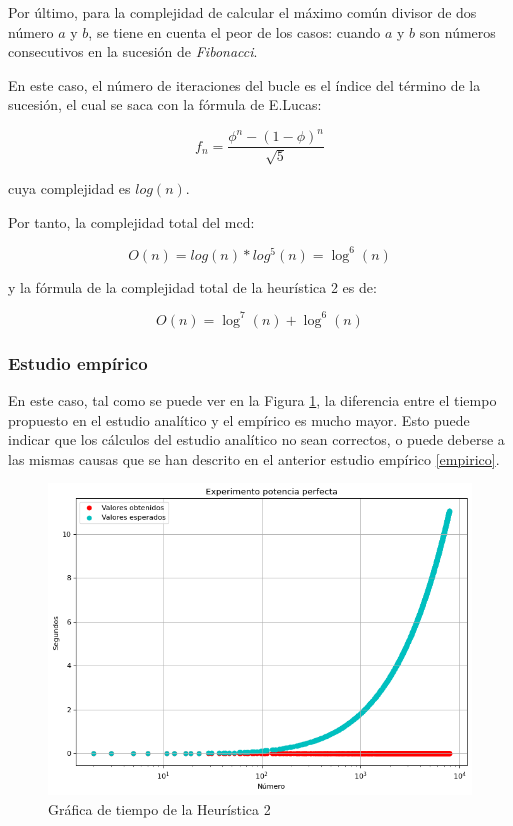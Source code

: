 \documentclass{uc3mpracticas}
\begin{document}
  \vspace{2mm}

  Por último, para la complejidad de calcular el máximo común divisor de dos número $a$ y $b$, se tiene en cuenta el peor de los casos: cuando $a$ y $b$ son números consecutivos en la sucesión de \textit{Fibonacci}.

  \vspace{2mm}

  En este caso, el número de iteraciones del bucle es el índice del término de la sucesión, el cual se saca con la fórmula de E.Lucas:

  $$ f_n =\frac{\phi^n - (1-\phi)^n}{\sqrt{5}} $$

  cuya complejidad es $ log(n) $.

  \vspace{2mm}


  Por tanto, la complejidad total del mcd:

  $$ O(n) = log(n) * log^5(n) = \log^6(n) $$

  y la fórmula de la complejidad total de la heurística 2 es de:

  $$ O(n) = \log^7(n) + \log^6(n)$$




  \subsubsection{Estudio empírico}

  En este caso, tal como se puede ver en la Figura \ref{fig:h2}, la diferencia entre el tiempo propuesto en el estudio analítico y el empírico es mucho mayor. Esto puede indicar que los cálculos del estudio analítico no sean correctos, o puede deberse a las mismas causas que se han descrito en el anterior estudio empírico \ref{empirico}.

  \begin{figure}[!h]
    \centering
    \includegraphics[width=.8\linewidth]{./Images/h2.png}
    \caption{Gráfica de tiempo de la Heurística 2}
    \label{fig:h2}
  \end{figure}
\end{document}
